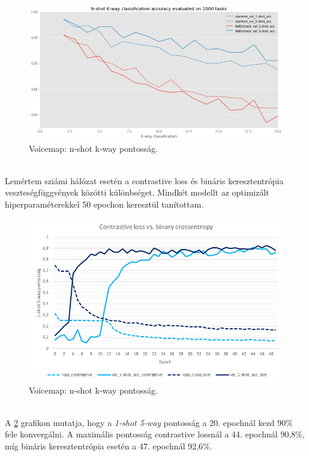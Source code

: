 \begin{figure}[!ht]
	\centering
	\includegraphics[width=150mm, keepaspectratio]{figures/voicemap-n-shot-k-way.png}
	\caption{Voicemap: n-shot k-way pontosság.}
	\label{fig:voicemap-n-shot-k-way}
\end{figure}

\newpage
\ \\
Lemértem sziámi hálózat esetén a contrastive loss és bináris keresztentrópia veszteségfüggvények közötti különbséget. Mindkét modellt az optimizált hiperparaméterekkel 50 epochon keresztül tanítottam.

\begin{figure}[!ht]
	\centering
	\includegraphics[width=150mm, keepaspectratio]{figures/contrastive_vs_bce.png}
	\caption{Voicemap: n-shot k-way pontosság.}
	\label{fig:contrastive_vs_bce}
\end{figure}
\ \\
A \ref{fig:contrastive_vs_bce} grafikon mutatja, hogy a \emph{1-shot 5-way} pontosság a 20. epochnál kezd 90\% fele konvergálni. A maximális pontosság contrastive lossnál a 44. epochnál 90,8\%, míg bináris keresztentrópia esetén a 47. epochnál 92,6\%.

